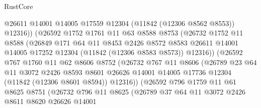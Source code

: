 \begin{lexlean}{RustCore}
\begin{coremodule}
                        @26611
                        @14001
                        @14005
                        @17559
                        @12304
                        (@11842 (@12306 @8562 @8553))
                        @12316))
                    (@26592
                      @1752
                      @1761
                      @11
                      @63
                      @8588
                      @8753
                      (@26732
                        @1752
                        @11
                        @8588
                        (@26849
                          @171
                          @64
                          @11
                          @8453
                          @2426
                          @8572
                          @8583
                          @26611
                          @14001
                          @14005
                          @17252
                          @12304
                          (@11842 (@12306 @8583 @8573))
                          @12316))
                      (@26592
                        @767
                        @1760
                        @11
                        @62
                        @8606
                        @8752
                        (@26732
                          @767
                          @11
                          @8606
                          (@26789
                            @23
                            @64
                            @11
                            @3072
                            @2426
                            @8593
                            @8601
                            @26626
                            @14001
                            @14005
                            @17736
                            @12304
                            (@11842 (@12306 @8601 @8594))
                            @12316))
                        (@26592
                          @796
                          @1759
                          @11
                          @61
                          @8625
                          @8751
                          (@26732
                            @796
                            @11
                            @8625
                            (@26789
                              @37
                              @64
                              @11
                              @3072
                              @2426
                              @8611
                              @8620
                              @26626
                              @14001

\end{coremodule}
\end{lexlean}
